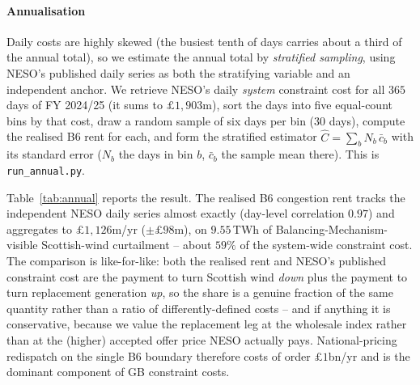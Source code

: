 \documentclass[review,3p,times]{elsarticle}
\theoremstyle{plain}
\theoremstyle{definition}
\begin{document}
\paragraph{Annualisation} Daily costs are highly skewed (the busiest tenth of
days carries about a third of the annual total), so we estimate the annual total
by \emph{stratified sampling}, using NESO's published daily series as both the
stratifying variable and an independent anchor. We retrieve NESO's daily
\emph{system} constraint cost for all $365$ days of FY 2024/25 (it sums to
$\pounds1{,}903$m), sort the days into five equal-count bins by that cost, draw a
random sample of six days per bin ($30$ days), compute the realised B6 rent for
each, and form the stratified estimator $\widehat{C}=\sum_b N_b\,\bar c_b$ with its
standard error ($N_b$ the days in bin $b$, $\bar c_b$ the sample mean there). This
is \texttt{run\_annual.py}.

Table~\ref{tab:annual} reports the result. The realised B6 congestion rent tracks
the independent NESO daily series almost exactly (day-level correlation $0.97$) and
aggregates to $\pounds1{,}126$m/yr ($\pm\pounds98$m), on $9.55$\,TWh of
Balancing-Mechanism-visible Scottish-wind curtailment -- about $59\%$ of the
system-wide constraint cost. The comparison is like-for-like: both the realised
rent and NESO's published constraint cost are the payment to turn Scottish wind
\emph{down} plus the payment to turn replacement generation \emph{up}, so the
share is a genuine fraction of the same quantity rather than a ratio of
differently-defined costs -- and if anything it is conservative, because we value
the replacement leg at the wholesale index rather than at the (higher) accepted
offer price NESO actually pays. National-pricing redispatch on the single B6
boundary therefore costs of order $\pounds1$bn/yr and is the dominant component of
GB constraint costs.
\end{document}
